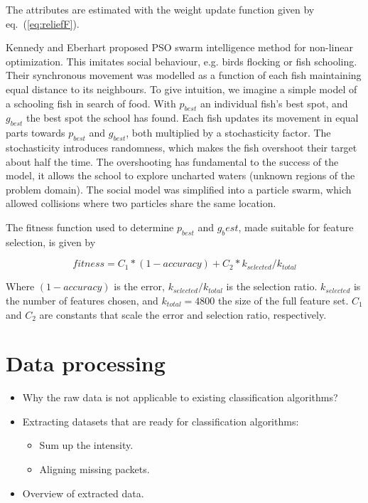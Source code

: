 \documentclass[runningheads]{llncs}
\begin{document}
The attributes are estimated with the weight update function given by eq.~(\ref{eq:reliefF}). 

Kennedy and Eberhart proposed PSO \cite{kennedy1995particle} swarm intelligence method for non-linear optimization.
This imitates social behaviour, e.g. birds flocking or fish schooling.
Their synchronous movement was modelled as a function of each fish maintaining equal distance to its neighbours. 
To give intuition, we imagine a simple model of a schooling fish in search of food. 
With $p_{best}$ an individual fish's best spot, and $g_{best}$ the best spot the school has found. 
Each fish updates its movement in equal parts towards $p_{best}$ and $g_{best}$, both multiplied by a stochasticity factor.
The stochasticity introduces randomness, which makes the fish overshoot their target about half the time. 
The overshooting has fundamental to the success of the model, it allows the school to explore uncharted waters (unknown regions of the problem domain). 
The social model was simplified into a particle swarm, which allowed collisions where two particles share the same location. 

The fitness function used to determine $p_{best}$ and $g_best$, made suitable for feature selection, is given by

\begin{equation}
  fitness = C_1 * (1 - accuracy) + C_2 * k_{selected} / k_{total}  
  \label{eq:pso}
\end{equation}

Where $(1 - accuracy)$ is the error, $k_{selected} / k_{total}$ is the selection ratio.
$k_{selected}$ is the number of features chosen, and $k_{total} = 4800$ the size of the full feature set.
$C_1$ and $C_2$ are constants that scale the error and selection ratio, respectively.

\section{Data processing}


\begin{itemize}
  \item Why the raw data is not applicable to existing classification algorithms?
  \item Extracting datasets that are ready for classification algorithms:
        \begin{itemize}
          \item Sum up the intensity.
          \item Aligning missing packets.
        \end{itemize}
  \item Overview of extracted data.
\end{itemize}
\end{document}
